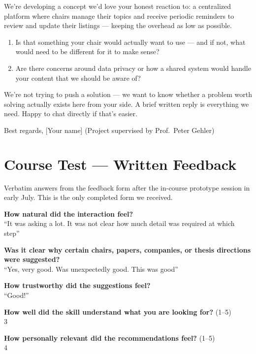 \documentclass[11pt,a4paper]{article}
\begin{document}
\noindent We're developing a concept we'd love your honest reaction to: a
centralized platform where chairs manage their topics and receive periodic
reminders to review and update their listings --- keeping the overhead as low as
possible.

\begin{enumerate}[leftmargin=1.4em,itemsep=0.35em,resume]
  \item Is that something your chair would actually want to use --- and if not,
 what would need to be different for it to make sense?
  \item Are there concerns around data privacy or how a shared system would
 handle your content that we should be aware of?
\end{enumerate}

\noindent We're not trying to push a solution --- we want to know whether a
problem worth solving actually exists here from your side. A brief written reply
is everything we need. Happy to chat directly if that's easier.

\medskip
\noindent Best regards, [Your name] (Project supervised by Prof.\ Peter Gehler)


\section{Course Test --- Written Feedback}
\label{app:gehler-feedback}

\noindent Verbatim answers from the feedback form after the in-course prototype
session in early July. This is the only completed form we received.

\medskip
\noindent \textbf{How natural did the interaction feel?}\\
``It was asking a lot. It was not clear how much detail was required at which
step''

\medskip
\noindent \textbf{Was it clear why certain chairs, papers, companies, or thesis
directions were suggested?}\\
``Yes, very good. Was unexpectedly good. This was good''

\medskip
\noindent \textbf{How trustworthy did the suggestions feel?}\\
``Good!''

\medskip
\noindent \textbf{How well did the skill understand what you are looking for?}
(1--5)\\
3

\medskip
\noindent \textbf{How personally relevant did the recommendations feel?}
(1--5)\\
4
\end{document}
